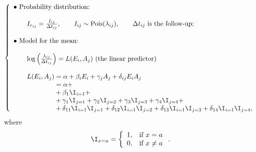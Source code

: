 




\begin{equation}
\label{eq:model}
\left\{
\begin{array}{l}
\bullet\ \text{Probability distribution:} \\ \\
\qquad
I_{r_{ij}}
=
\frac{I_{ij}}{\Delta t_{ij}},
\qquad
I_{ij} \sim  \text{Pois}(\lambda_{ij}),
\qquad
\Delta t_{ij}\text{ is the follow-up;}\\ \\
\bullet\ \text{Model for the mean:} \\ \\
\qquad
\log
\left(
\frac{\lambda_{ij}}{\Delta t_{ij}}
\right)
=
L(E_i, A_j) \text{ (the linear predictor)}\\ \\
\qquad
L(E_i, A_j)
 = 
\alpha + \beta_i E_i + \gamma_j A_j + \delta_{ij} E_i A_j\\
\phantom{
\qquad
L(E_i, A_j)
}
 = 
\alpha + \\
\phantom{
\qquad
L(E_i, A_j)
} + \beta_1 \I_{i=1} + \\
\phantom{
\qquad
L(E_i, A_j)
} + 
\gamma_1 \I_{j=1} +
\gamma_2 \I_{j=2} +
\gamma_3 \I_{j=3} +
\gamma_4 \I_{j=4} +\\
\phantom{
\qquad
L(E_i, A_j)
} + 
\delta_{11} \I_{i=1}\I_{j=1} +
\delta_{12} \I_{i=1}\I_{j=2} +
\delta_{13} \I_{i=1}\I_{j=3} +
\delta_{14} \I_{i=1}\I_{j=4},
\end{array}
\right.
\end{equation}
where
\begin{equation*}
\I_{x=a}
=
\left\{
\begin{array}{ll}
1, & \text{if } x = a \\
0, & \text{if } x \neq a
\end{array}
\right..
\end{equation*}

